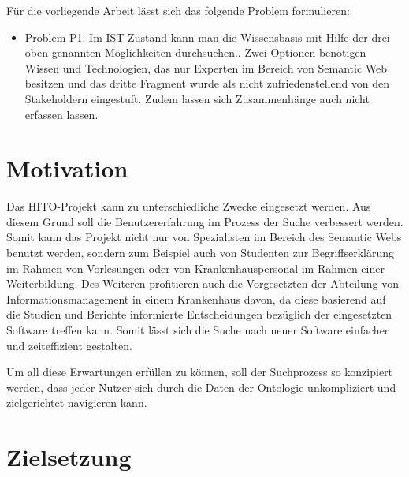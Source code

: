 
Für die vorliegende Arbeit lässt sich das folgende Problem formulieren:

\begin{itemize}
\item Problem P1: Im IST-Zustand kann man die Wissensbasis mit Hilfe der drei oben genannten Möglichkeiten durchsuchen.. 
Zwei Optionen benötigen Wissen und Technologien, das nur Experten im Bereich von Semantic Web besitzen und das dritte Fragment wurde als nicht zufriedenstellend von den Stakeholdern eingestuft.
Zudem lassen sich Zusammenhänge auch nicht erfassen lassen.
\end{itemize}

\section{Motivation}\label{sec:motivation}

Das HITO-Projekt kann zu unterschiedliche Zwecke eingesetzt werden. Aus diesem Grund soll die Benutzererfahrung im Prozess der Suche verbessert werden. Somit kann das Projekt nicht nur von Spezialisten im Bereich des Semantic Webs benutzt werden, sondern zum Beispiel auch von Studenten zur Begriffserklärung im Rahmen von Vorlesungen oder von Krankenhauspersonal im Rahmen einer Weiterbildung. Des Weiteren profitieren auch die Vorgesetzten der Abteilung von Informationsmanagement in einem Krankenhaus davon, da diese basierend auf die Studien und Berichte informierte Entscheidungen bezüglich der eingesetzten Software treffen kann. Somit lässt sich die Suche nach neuer Software einfacher und zeiteffizient gestalten.

Um all diese Erwartungen erfüllen zu können, soll der Suchprozess so konzipiert werden, dass jeder Nutzer sich durch die Daten der Ontologie unkompliziert und zielgerichtet navigieren kann.

\section{Zielsetzung}\label{sec:zielsetzung}

